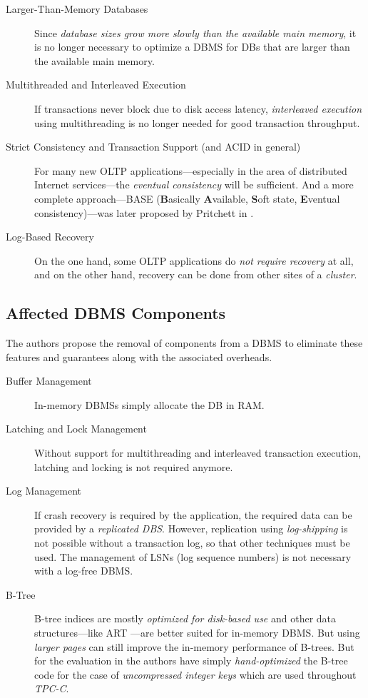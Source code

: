     \begin{description}
        \item[Larger-Than-Memory Databases] Since \emph{database sizes grow more slowly than the available main memory}, it is no longer necessary to optimize a DBMS for DBs that are larger than the available main memory.
        \item[Multithreaded and Interleaved Execution] If transactions never block due to disk access latency, \emph{interleaved execution} using multithreading is no longer needed for good transaction throughput.
        \item[Strict Consistency and Transaction Support (and ACID in general)] For many new OLTP applications---especially in the area of distributed Internet services---the \emph{eventual consistency} will be sufficient. And a more complete approach---BASE (\textbf{B}asically \textbf{A}vailable, \textbf{S}oft state, \textbf{E}ventual consistency)---was later proposed by Pritchett in \cite{Pritchett:2008}.
        \item[Log-Based Recovery] On the one hand, some OLTP applications do \emph{not require recovery} at all, and on the other hand, recovery can be done from other sites of a \emph{cluster}.
    \end{description}

\subsection{Affected DBMS Components}

    The authors propose the removal of components from a DBMS to eliminate these features and guarantees along with the associated overheads.

    \begin{description}
        \item[Buffer Management] In-memory DBMSs simply allocate the DB in RAM.
        \item[Latching and Lock Management] Without support for multithreading and interleaved transaction execution, latching and locking is not required anymore.
        \item[Log Management] If crash recovery is required by the application, the required data can be provided by a \emph{replicated DBS}. However, replication using \emph{log-shipping} is not possible without a transaction log, so that other techniques must be used. The management of LSNs (log sequence numbers) is not necessary with a log-free DBMS.
        \item[B-Tree] B-tree indices are mostly \emph{optimized for disk-based use} \cite{Bayer:1970} and other data structures---like ART \cite{Leis:2013}---are better suited for in-memory DBMS. But using \emph{larger pages} can still improve the in-memory performance of B-trees. But for the evaluation in \cite{Harizopoulos:2008} the authors have simply \emph{hand-optimized} the B-tree code for the case of \emph{uncompressed integer keys} which are used throughout \textit{TPC-C}.
    \end{description}

